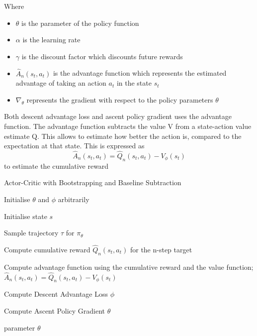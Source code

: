 \documentclass{article}
\begin{document}
Where 
\begin{itemize}[itemsep=0.0pt]
\renewcommand\labelitemi{.}
\item $\theta$ is the parameter of the policy function
\item $\alpha$ is the learning rate
\item $\gamma$ is the discount factor which discounts future rewards
\item $\hat{A}_n(s_t,a_t)$ is the advantage function which represents the estimated advantage of taking an action $a_t$ in the state $s_t$
\item $\nabla_\theta$ represents the gradient with respect to the policy parameters $\theta$
\end{itemize}
Both descent advantage loss and ascent policy gradient uses the advantage function. The advantage function subtracts the value V from a state-action value estimate Q. This allows to estimate how better the action is, compared to the expectation at that state. This is expressed as 
\begin{equation*}
    \hat{A}_n(s_t,a_t) = \hat{Q}_n(s_t,a_t) - V_\phi(s_t)
\end{equation*}
to estimate the cumulative reward \(\)
\begin{algorithm}[h!]
\caption{Actor-Critic with Bootstrapping and Baseline Subtraction}
\SetAlgoLined
\DontPrintSemicolon
\small %
Initialise $\theta$ and $\phi$ arbitrarily\;\\
{
    Initialise state $s$\;
     \item Sample trajectory $\tau$ for $\pi_\theta$
     \item
    {
     \item Compute cumulative reward $\hat{Q}_n(s_t,a_t)$  for the n-step target
     \item Compute advantage function using the cumulative reward and the value function;
     \(\hat{A}_n(s_t,a_t) = \hat{Q}_n(s_t,a_t) - V_\phi(s_t)\)
    }
    \item Compute Descent Advantage Loss $\phi$
     \item Compute Ascent Policy Gradient $\theta$
}
\State \Return parameter $\theta$
\end{algorithm}
\end{document}
